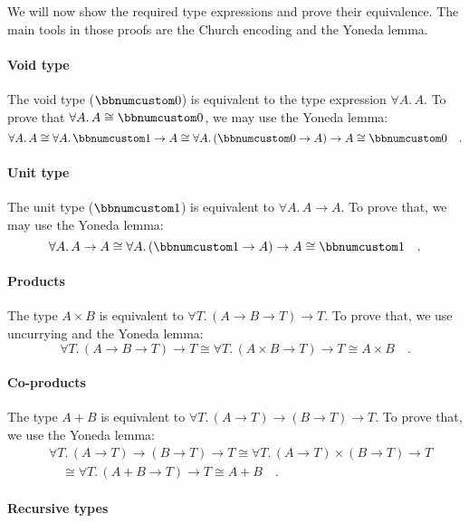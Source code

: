 We will now show the required type expressions and prove their equivalence.
The main tools in those proofs are the Church encoding and the Yoneda
lemma.

\paragraph{Void type}

The void type ($\bbnum 0$) is equivalent to the type expression $\forall A.\,A$.
To prove that $\forall A.\,A\cong\bbnum 0$, we may use the Yoneda
lemma:
\[
\forall A.\,A\cong\forall A.\,\bbnum 1\rightarrow A\cong\forall A.\,(\bbnum 0\rightarrow A)\rightarrow A\cong\bbnum 0\quad.
\]


\paragraph{Unit type}

The unit type ($\bbnum 1$) is equivalent to $\forall A.\,A\rightarrow A$.
To prove that, we may use the Yoneda lemma:
\[
\forall A.\,A\rightarrow A\cong\forall A.\,(\bbnum 1\rightarrow A)\rightarrow A\cong\bbnum 1\quad.
\]


\paragraph{Products}

The type $A\times B$ is equivalent to $\forall T.\,(A\rightarrow B\rightarrow T)\rightarrow T$.
To prove that, we use uncurrying and the Yoneda lemma:
\[
\forall T.\,(A\rightarrow B\rightarrow T)\rightarrow T\cong\forall T.\,(A\times B\rightarrow T)\rightarrow T\cong A\times B\quad.
\]


\paragraph{Co-products}

The type $A+B$ is equivalent to $\forall T.\,(A\rightarrow T)\rightarrow(B\rightarrow T)\rightarrow T$.
To prove that, we use the Yoneda lemma:
\begin{align*}
 & \forall T.\,(A\rightarrow T)\rightarrow(B\rightarrow T)\rightarrow T\cong\forall T.\,(A\rightarrow T)\times(B\rightarrow T)\rightarrow T\\
 & \quad\cong\forall T.\,(A+B\rightarrow T)\rightarrow T\cong A+B\quad.
\end{align*}


\paragraph{Recursive types}

